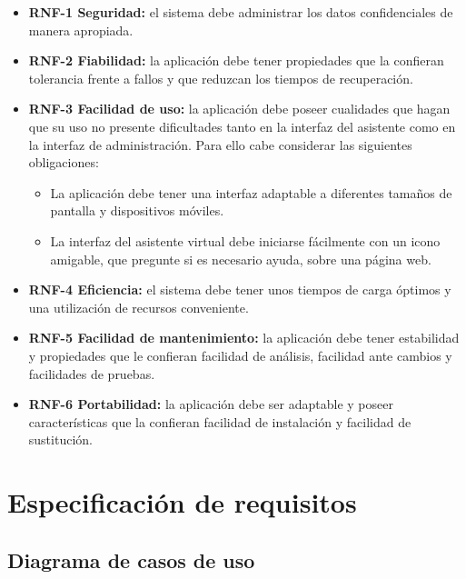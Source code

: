\begin{itemize}
\tightlist

\item
\textbf{RNF-1 Seguridad:} el sistema debe administrar los datos confidenciales de manera apropiada.

\item
\textbf{RNF-2 Fiabilidad:} la aplicación debe tener propiedades que la confieran tolerancia frente a fallos y que reduzcan los tiempos de recuperación.

\item
\textbf{RNF-3 Facilidad de uso:} la aplicación debe poseer cualidades que hagan que su uso no presente dificultades tanto en la interfaz del asistente como en la interfaz de administración. Para ello cabe considerar las siguientes obligaciones:
	\begin{itemize}
	\tightlist
	\item
	La aplicación debe tener una interfaz adaptable a diferentes tamaños de pantalla y dispositivos móviles.
	\item
	La interfaz del asistente virtual debe iniciarse fácilmente con un icono amigable, que pregunte si es necesario ayuda, sobre una página web.
	\end{itemize}

\item
\textbf{RNF-4 Eficiencia:} el sistema debe tener unos tiempos de carga óptimos y una utilización de recursos conveniente.

\item
\textbf{RNF-5 Facilidad de mantenimiento:} la aplicación debe tener estabilidad y propiedades que le confieran facilidad de análisis, facilidad ante cambios y facilidades de pruebas.

\item
\textbf{RNF-6 Portabilidad:} la aplicación debe ser adaptable y poseer características que la confieran facilidad de instalación y facilidad de sustitución.

\end{itemize}


\section{Especificación de requisitos}

\newpage
\subsection{Diagrama de casos de uso}

